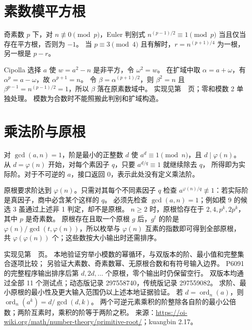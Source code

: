 \section{素数模平方根}\label{knowledge-quadratic-residue}
奇素数 $p$ 下，对 $n\not\equiv0\pmod p$，Euler 判别式
$n^{(p-1)/2}\equiv1\pmod p$ 当且仅当存在平方根，否则为 $-1$。
当 $p\equiv3\pmod4$ 且有解时，$r=n^{(p+1)/4}$ 为一根，另一根是 $p-r$。

Cipolla 选择 $a$ 使 $w=a^2-n$ 是非平方，令 $\omega^2=w$。
在扩域中取 $\alpha=a+\omega$，有 $\alpha^p=a-\omega$，故 $\alpha^{p+1}=n$。
令 $\beta=\alpha^{(p+1)/2}$，则 $\beta^2=n$ 且
$\beta^{p-1}=n^{(p-1)/2}=1$，所以 $\beta$ 落在原素数域中。
实现见第~\pageref{compact-mod_sqrt}~页；零和模数 2 单独处理。
模数为合数时不能照搬此判别和扩域构造。

\section{乘法阶与原根}\label{knowledge-primitive-root}
对 $\gcd(a,n)=1$，阶是最小的正整数 $d$ 使 $a^d\equiv1\pmod n$，且 $d\mid\varphi(n)$。
从 $d=\varphi(n)$ 开始，对每个素因子 $q$，只要 $a^{d/q}\equiv1$ 就继续除去 $q$，
所得即为实际阶。对于不可逆的 $a$，接口返回 0，表示此处没有定义乘法阶。

原根要求阶达到 $\varphi(n)$。只需对其每个不同素因子 $q$ 检查
$a^{\varphi(n)/q}\not\equiv1$：若实际阶是真因子，商中必含某个这样的 $q$。
必须先检查 $\gcd(a,n)=1$；例如模 9 的候选 3 虽通过上述非 1 判定，却不是原根。
$n\ge2$ 时，原根恰存在于 $2,4,p^k,2p^k$，其中 $p$ 是奇素数。
原根存在且取一个原根 $g$ 后，$g^t$ 的阶是
$\varphi(n)/\gcd(t,\varphi(n))$，所以枚举与 $\varphi(n)$ 互素的指数即可得到全部原根，
共 $\varphi(\varphi(n))$ 个；这些数按大小输出时还需排序。

实现见第~\pageref{compact-PrimitiveRoot}~页。
本地验证穷举小模数的幂循环，与双版本的阶、最小值和完整集合逐项比较；
另验证大素数、奇素数幂、无原根合数和有符号输入边界。
P6091 的完整程序输出排序后第 $d,2d,\ldots$ 个原根，零个输出时仍保留空行。
双版本均通过全部 11 个测试点；动态版记录 297558740，传统版记录 297559082。
求阶、最小原根的最小性及更大输入范围仍以上述本地证据验证。
若 $d=\operatorname{ord}_n(a)$，则 $\operatorname{ord}_n(a^k)=d/\gcd(d,k)$。
两个可逆元素乘积的阶整除各自阶的最小公倍数；两阶互素时，乘积的阶等于两阶之积。
来源：\url{https://oi-wiki.org/math/number-theory/primitive-root/}；kuangbin 2.17。

